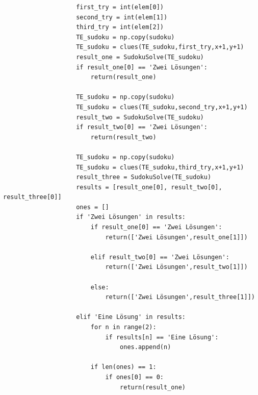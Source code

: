 \documentclass[11pt,a4paper]{article}
\begin{document}
\begin{verbatim}
                    first_try = int(elem[0])       
                    second_try = int(elem[1])     
                    third_try = int(elem[2])       
                    TE_sudoku = np.copy(sudoku)    
                    TE_sudoku = clues(TE_sudoku,first_try,x+1,y+1)  
                    result_one = SudokuSolve(TE_sudoku)   
                    if result_one[0] == 'Zwei Lösungen':  
                        return(result_one)                
                    
                    TE_sudoku = np.copy(sudoku)                    
                    TE_sudoku = clues(TE_sudoku,second_try,x+1,y+1) 
                    result_two = SudokuSolve(TE_sudoku)            
                    if result_two[0] == 'Zwei Lösungen':  
                        return(result_two)               
                                                
                    TE_sudoku = np.copy(sudoku)                   
                    TE_sudoku = clues(TE_sudoku,third_try,x+1,y+1) 
                    result_three = SudokuSolve(TE_sudoku)         
                    results = [result_one[0], result_two[0], result_three[0]] 
                    ones = []                                                 
                    if 'Zwei Lösungen' in results:                             
                        if result_one[0] == 'Zwei Lösungen':                  
                            return(['Zwei Lösungen',result_one[1]])           
                                
                        elif result_two[0] == 'Zwei Lösungen':
                            return(['Zwei Lösungen',result_two[1]])
                                
                        else:
                            return(['Zwei Lösungen',result_three[1]])
                                        
                    elif 'Eine Lösung' in results:                            
                        for n in range(2):                                    
                            if results[n] == 'Eine Lösung':                   
                                ones.append(n)                                
                        
                        if len(ones) == 1:                                    
                            if ones[0] == 0:                                  
                                return(result_one)                            
                            

\end{verbatim}
\end{document}
